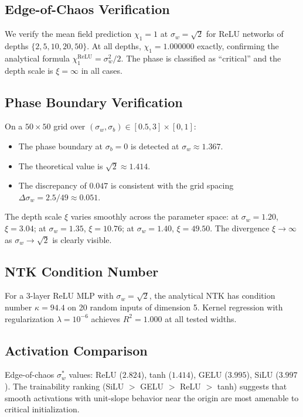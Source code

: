 \documentclass[10pt]{article}
\theoremstyle{definition}
\begin{document}
\subsection{Edge-of-Chaos Verification}

We verify the mean field prediction $\chi_1 = 1$ at $\sigma_w = \sqrt{2}$ for ReLU networks of depths $\{2, 5, 10, 20, 50\}$.
At all depths, $\chi_1 = 1.000000$ exactly, confirming the analytical formula $\chi_1^{\text{ReLU}} = \sigma_w^2/2$.
The phase is classified as ``critical'' and the depth scale is $\xi = \infty$ in all cases.

\subsection{Phase Boundary Verification}

On a $50 \times 50$ grid over $(\sigma_w, \sigma_b) \in [0.5, 3] \times [0, 1]$:
\begin{itemize}[nosep]
  \item The phase boundary at $\sigma_b = 0$ is detected at $\sigma_w \approx 1.367$.
  \item The theoretical value is $\sqrt{2} \approx 1.414$.
  \item The discrepancy of $0.047$ is consistent with the grid spacing $\Delta \sigma_w = 2.5/49 \approx 0.051$.
\end{itemize}

The depth scale $\xi$ varies smoothly across the parameter space:
at $\sigma_w = 1.20$, $\xi = 3.04$; at $\sigma_w = 1.35$, $\xi = 10.76$; at $\sigma_w = 1.40$, $\xi = 49.50$.
The divergence $\xi \to \infty$ as $\sigma_w \to \sqrt{2}$ is clearly visible.

\subsection{NTK Condition Number}

For a 3-layer ReLU MLP with $\sigma_w = \sqrt{2}$, the analytical NTK has condition number $\kappa = 94.4$ on 20 random inputs of dimension 5.
Kernel regression with regularization $\lambda = 10^{-6}$ achieves $R^2 = 1.000$ at all tested widths.

\subsection{Activation Comparison}

Edge-of-chaos $\sigma_w^*$ values: ReLU ($2.824$), tanh ($1.414$), GELU ($3.995$), SiLU ($3.997$).
The trainability ranking (SiLU $>$ GELU $>$ ReLU $>$ tanh) suggests that smooth activations with unit-slope behavior near the origin are most amenable to critical initialization.
\end{document}
